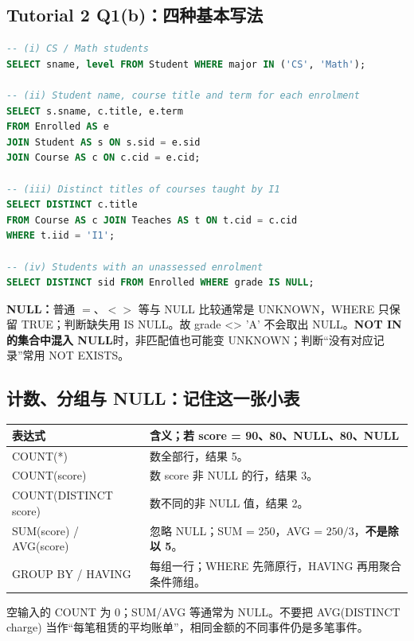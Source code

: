 \documentclass[11pt,a4paper]{article}
\begin{document}
\subsection{Tutorial 2 Q1(b)：四种基本写法}
\begin{lstlisting}[language=SQL,basicstyle=\ttfamily\footnotesize]
-- (i) CS / Math students
SELECT sname, level FROM Student WHERE major IN ('CS', 'Math');

-- (ii) Student name, course title and term for each enrolment
SELECT s.sname, c.title, e.term
FROM Enrolled AS e
JOIN Student AS s ON s.sid = e.sid
JOIN Course AS c ON c.cid = e.cid;

-- (iii) Distinct titles of courses taught by I1
SELECT DISTINCT c.title
FROM Course AS c JOIN Teaches AS t ON t.cid = c.cid
WHERE t.iid = 'I1';

-- (iv) Students with an unassessed enrolment
SELECT DISTINCT sid FROM Enrolled WHERE grade IS NULL;
\end{lstlisting}
\textbf{NULL：}普通 $=$、$<>$ 等与 NULL 比较通常是 UNKNOWN，WHERE 只保留 TRUE；判断缺失用 IS NULL。故 grade <> 'A' 不会取出 NULL。\textbf{NOT IN 的集合中混入 NULL}时，非匹配值也可能变 UNKNOWN；判断“没有对应记录”常用 NOT EXISTS。

\subsection{计数、分组与 NULL：记住这一张小表}
\begin{tabularx}{\linewidth}{@{}lX@{}}
\toprule 表达式 & 含义；若 score = 90、80、NULL、80、NULL \\
\midrule
COUNT(*) & 数全部行，结果 5。\\
COUNT(score) & 数 score 非 NULL 的行，结果 3。\\
COUNT(DISTINCT score) & 数不同的非 NULL 值，结果 2。\\
SUM(score) / AVG(score) & 忽略 NULL；SUM = 250，AVG = $250/3$，\textbf{不是除以 5}。\\
GROUP BY / HAVING & 每组一行；WHERE 先筛原行，HAVING 再用聚合条件筛组。\\
\bottomrule
\end{tabularx}
空输入的 COUNT 为 0；SUM/AVG 等通常为 NULL。不要把 AVG(DISTINCT charge) 当作“每笔租赁的平均账单”，相同金额的不同事件仍是多笔事件。
\end{document}
